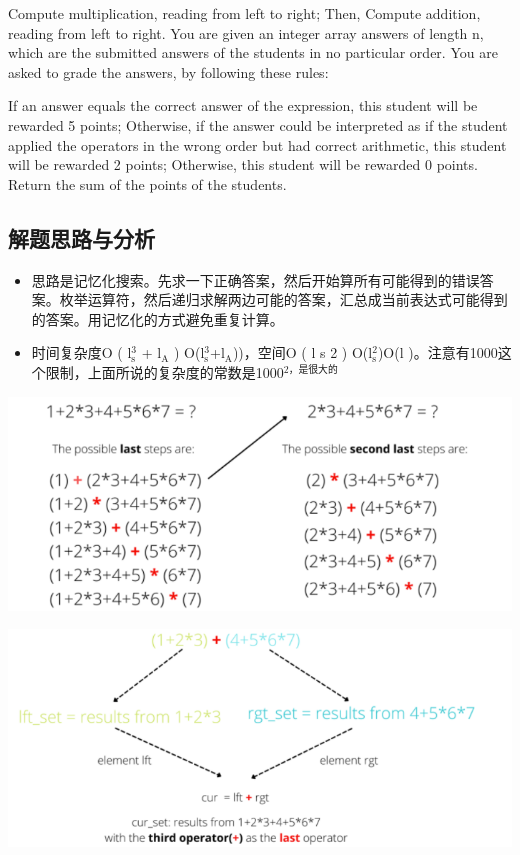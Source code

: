 \documentclass[9pt, b5paaper]{book}
\begin{document}
Compute multiplication, reading from left to right; Then,
Compute addition, reading from left to right.
You are given an integer array answers of length n, which are the submitted answers of the students in no particular order. You are asked to grade the answers, by following these rules:

If an answer equals the correct answer of the expression, this student will be rewarded 5 points;
Otherwise, if the answer could be interpreted as if the student applied the operators in the wrong order but had correct arithmetic, this student will be rewarded 2 points;
Otherwise, this student will be rewarded 0 points.
Return the sum of the points of the students.
\subsection{解题思路与分析}
\label{sec-1-5-1}
\begin{itemize}
\item 思路是记忆化搜索。先求一下正确答案，然后开始算所有可能得到的错误答案。枚举运算符，然后递归求解两边可能的答案，汇总成当前表达式可能得到的答案。用记忆化的方式避免重复计算。
\item 时间复杂度O ( l$_{\text{s}}^{\text{3}}$ + l$_{\text{A}}$ ) O(l$_{\text{s}}^{\text{3}}$+l$_{\text{A}}$))，空间O ( l s 2 ) O(l$_{\text{s}}^{\text{2}}$)O(l )。注意有1000这个限制，上面所说的复杂度的常数是1000$^{\text{2，是很大的}}$
\end{itemize}

\includegraphics[width=.9\linewidth]{./pic/score.png}

\includegraphics[width=.9\linewidth]{./pic/score2.png}
\end{document}
